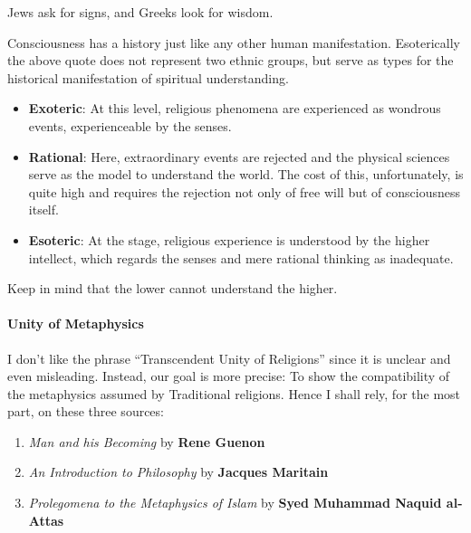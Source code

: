 \begin{quotex}
Jews ask for signs, and Greeks look for wisdom.
\end{quotex}


Consciousness has a history just like any other human manifestation. Esoterically the above quote does not represent two ethnic groups, but serve as types for the historical manifestation of spiritual understanding.

\begin{itemize}


\item \textbf{Exoteric}: At this level, religious phenomena are experienced as wondrous events, experienceable by the senses.

\item \textbf{Rational}: Here, extraordinary events are rejected and the physical sciences serve as the model to understand the world. The cost of this, unfortunately, is quite high and requires the rejection not only of free will but of consciousness itself.

\item \textbf{Esoteric}: At the stage, religious experience is understood by the higher intellect, which regards the senses and mere rational thinking as inadequate.
\end{itemize}


Keep in mind that the lower cannot understand the higher.

\paragraph{Unity of Metaphysics}


I don't like the phrase ``Transcendent Unity of Religions'' since it is unclear and even misleading. Instead, our goal is more precise: To show the compatibility of the metaphysics assumed by Traditional religions. Hence I shall rely, for the most part, on these three sources:

\begin{enumerate}


\item \emph{Man and his Becoming} by \textbf{Rene Guenon}


\item \emph{An Introduction to Philosophy} by \textbf{Jacques Maritain}


\item \emph{Prolegomena to the Metaphysics of Islam} by \textbf{Syed Muhammad Naquid al-Attas}
\end{enumerate}


